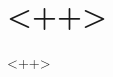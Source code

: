 \documentclass{antequam-template}      %
\begin{document}
  \chapter{<++>}
  \newpage

   <++>
\end{document}
